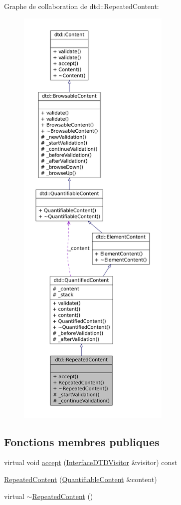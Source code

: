Graphe de collaboration de dtd::RepeatedContent:\nopagebreak
\begin{figure}[H]
\begin{center}
\leavevmode
\includegraphics[height=600pt]{classdtd_1_1_repeated_content__coll__graph}
\end{center}
\end{figure}
\subsection*{Fonctions membres publiques}
\begin{DoxyCompactItemize}
\item 
virtual void \hyperlink{classdtd_1_1_repeated_content_af97dd8df71c00b1ec91d577671c8ed77}{accept} (\hyperlink{classdtd_1_1_interface_d_t_d_visitor}{InterfaceDTDVisitor} \&visitor) const 
\item 
\hyperlink{classdtd_1_1_repeated_content_a05f44a98e9d27becfd1690c9638fe339}{RepeatedContent} (\hyperlink{classdtd_1_1_quantifiable_content}{QuantifiableContent} \&content)
\item 
virtual \hyperlink{classdtd_1_1_repeated_content_afd585386d77a53f9bba1507a5fd58c6f}{$\sim$RepeatedContent} ()
\end{DoxyCompactItemize}
